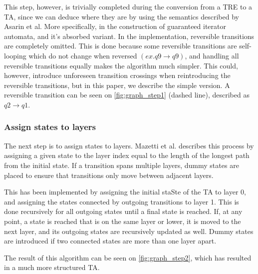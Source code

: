 This step, however, is trivially completed during the conversion from a TRE to a TA, since we can deduce where they are by using the semantics described by Asarin et al.
More specifically, in the construction of guaranteed iterator automata, and it's absorbed variant\cite{Eugene2001}.
In the implementation, reversible transitions are completely omitted. This is done because some reversible transitions are self-looping which do not change when reversed $(ex. q9\rightarrow q9)$, and handling all reversible transitions equally makes the algorithm much simpler. This could, however, introduce unforeseen transition crossings when reintroducing the reversible transitions, but in this paper, we describe the simple version. A reversible transition can be seen on \cref{fig:graph_step1} (dashed line), described as $q2\rightarrow q1$.

\begin{center}
    
\end{center}

\subsubsection{Assign states to layers}
The next step is to assign states to layers. Mazetti et al. describes this process by assigning a given state to the layer index equal to the length of the longest path from the initial state. If a transition spans multiple layers, dummy states are placed to ensure that transitions only move between adjacent layers. \cite{Mazetti2012}

This has been implemented by assigning the initial staSte of the TA to layer 0, and assigning the states connected by outgoing transitions to layer 1.
This is done recursively for all outgoing states until a final state is reached.
If, at any point, a state is reached that is on the same layer or lower, it is moved to the next layer, and its outgoing states are recursively updated as well.
Dummy states are introduced if two connected states are more than one layer apart.

The result of this algorithm can be seen on \cref{fig:graph_step2}, which has resulted in a much more structured TA.

\begin{center}
    
\end{center}

